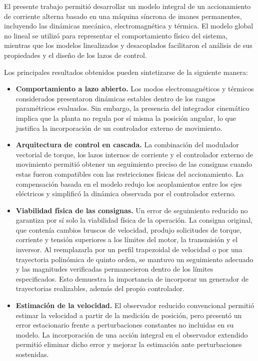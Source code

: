 \documentclass[10pt,a4paper]{article}
\begin{document}
El presente trabajo permitió desarrollar un modelo integral de un accionamiento
de corriente alterna basado en una máquina síncrona de imanes permanentes,
incluyendo las dinámicas mecánica, electromagnética y térmica. El modelo global
no lineal se utilizó para representar el comportamiento físico del sistema,
mientras que los modelos linealizados y desacoplados facilitaron el análisis de
sus propiedades y el diseño de los lazos de control.

Los principales resultados obtenidos pueden sintetizarse de la siguiente
manera:

\begin{itemize}
	\setlength{\itemsep}{0.6em}
	
	\item \textbf{Comportamiento a lazo abierto.}
	Los modos electromagnéticos y térmicos considerados presentaron dinámicas
	estables dentro de los rangos paramétricos evaluados. Sin embargo, la
	presencia del integrador cinemático implica que la planta no regula por sí
	misma la posición angular, lo que justifica la incorporación de un
	controlador externo de movimiento.
	
	\item \textbf{Arquitectura de control en cascada.}
	La combinación del modulador vectorial de torque, los lazos internos de
	corriente y el controlador externo de movimiento permitió obtener un
	seguimiento preciso de las consignas cuando estas fueron compatibles con
	las restricciones físicas del accionamiento. La compensación basada en el
	modelo redujo los acoplamientos entre los ejes eléctricos y simplificó la
	dinámica observada por el controlador externo.
	
	\item \textbf{Viabilidad física de las consignas.}
	Un error de seguimiento reducido no garantiza por sí solo la viabilidad
	física de la operación. La consigna original, que contenía cambios bruscos
	de velocidad, produjo solicitudes de torque, corriente y tensión superiores
	a los límites del motor, la transmisión y el inversor. Al reemplazarla por
	un perfil trapezoidal de velocidad o por una trayectoria polinómica de
	quinto orden, se mantuvo un seguimiento adecuado y las magnitudes
	verificadas permanecieron dentro de los límites especificados. Esto
	demuestra la importancia de incorporar un generador de trayectorias
	realizables, además del propio controlador.
	
	\item \textbf{Estimación de la velocidad.}
	El observador reducido convencional permitió estimar la velocidad a partir
	de la medición de posición, pero presentó un error estacionario frente a
	perturbaciones constantes no incluidas en su modelo. La incorporación de
	una acción integral en el observador extendido permitió eliminar dicho
	error y mejorar la estimación ante perturbaciones sostenidas.
	

\end{itemize}
\end{document}
